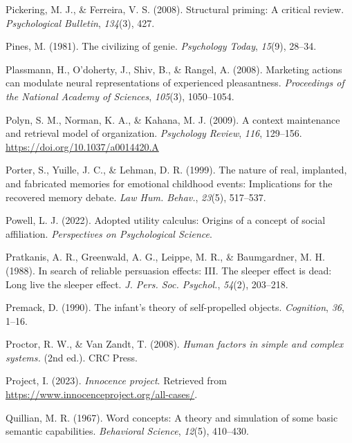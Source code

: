 \documentclass[
]{krantz}
\newlength{\cslhangindent}
\newenvironment{CSLReferences}[2] %
 {\begin{list}{}{%
  \setlength{\itemindent}{0pt}
  \setlength{\leftmargin}{0pt}
  \setlength{\parsep}{0pt}
  \ifodd #1
   \setlength{\leftmargin}{\cslhangindent}
   \setlength{\itemindent}{-1\cslhangindent}
  \fi
  \setlength{\itemsep}{#2\baselineskip}}}
 {\end{list}}
\begin{document}
\begin{CSLReferences}{1}{0}
Pickering, M. J., \& Ferreira, V. S. (2008). Structural priming: A critical review. \emph{Psychological Bulletin}, \emph{134}(3), 427.

Pines, M. (1981). The civilizing of genie. \emph{Psychology Today}, \emph{15}(9), 28--34.

Plassmann, H., O'doherty, J., Shiv, B., \& Rangel, A. (2008). Marketing actions can modulate neural representations of experienced pleasantness. \emph{Proceedings of the National Academy of Sciences}, \emph{105}(3), 1050--1054.

Polyn, S. M., Norman, K. A., \& Kahana, M. J. (2009). A context maintenance and retrieval model of organization. \emph{Psychology Review}, \emph{116}, 129--156. \url{https://doi.org/10.1037/a0014420.A}

Porter, S., Yuille, J. C., \& Lehman, D. R. (1999). The nature of real, implanted, and fabricated memories for emotional childhood events: Implications for the recovered memory debate. \emph{Law Hum. Behav.}, \emph{23}(5), 517--537.

Powell, L. J. (2022). Adopted utility calculus: Origins of a concept of social affiliation. \emph{Perspectives on Psychological Science}.

Pratkanis, A. R., Greenwald, A. G., Leippe, M. R., \& Baumgardner, M. H. (1988). In search of reliable persuasion effects: {III}. The sleeper effect is dead: Long live the sleeper effect. \emph{J. Pers. Soc. Psychol.}, \emph{54}(2), 203--218.

Premack, D. (1990). The infant's theory of self-propelled objects. \emph{Cognition}, \emph{36}, 1--16.

Proctor, R. W., \& Van Zandt, T. (2008). \emph{Human factors in simple and complex systems.} (2nd ed.). CRC Press.

Project, I. (2023). \emph{Innocence project}. Retrieved from \url{https://www.innocenceproject.org/all-cases/}.

Quillian, M. R. (1967). Word concepts: A theory and simulation of some basic semantic capabilities. \emph{Behavioral Science}, \emph{12}(5), 410--430.


\end{CSLReferences}
\end{document}

